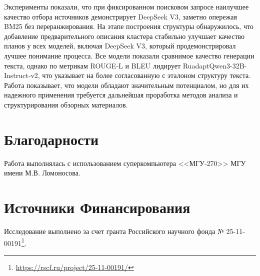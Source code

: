 \documentclass{article}
\begin{document}
Эксперименты показали, что при фиксированном поисковом запросе наилучшее качество отбора источников демонстрирует DeepSeek V3, 
заметно опережая BM25 без переранжирования.
На этапе построения структуры обнаружилось, что добавление предварительного описания кластера стабильно улучшает качество планов у всех моделей, включая DeepSeek V3, который продемонстрировал лучшее понимание процесса.
Все модели показали сравнимое качество генерации текста, однако по метрикам ROUGE-L и BLEU лидирует RuadaptQwen3-\allowbreak 32B-\allowbreak Instruct-\allowbreak v2, что указывает на более согласованную с эталоном структуру текста.
Работа показывает, что модели обладают значительным потенциалом, 
но для их надежного применения требуется дальнейшая проработка методов анализа и структурирования обзорных материалов.

\section*{Благодарности}
Работа выполнялась с использованием суперкомпьютера <<МГУ-270>> МГУ имени М.В. Ломоносова.

\section*{Источники Финансирования}
Исследование выполнено за счет гранта Российского научного фонда № 25-11-00191\footnote{\url{https://rscf.ru/project/25-11-00191/}}.
\end{document}
